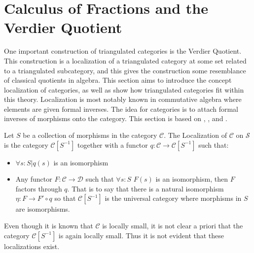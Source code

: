 \section{Calculus of Fractions and the Verdier Quotient}
    One important construction of triangulated categories is the Verdier Quotient. This construction is a localization of a triangulated category at some set related to a triangulated subcategory, and this gives the construction some resemblance of classical quotients in algebra. This section aims to introduce the concept localization of categories, as well as show how triangulated categories fit within this theory. Localization is most notably known in commutative algebra where elements are given formal inverses. The idea for categories is to attach formal inverses of morphisms onto the category. This section is based on \cite{weibel}, \cite{zisman}, and \cite{neeman}.
    \begin{definition}
        Let $S$ be a collection of morphisms in the category $\mathcal{C}$. The Localization of $\mathcal{C}$ on $\mathcal{S}$ is the category $\mathcal{C}[S^{-1}]$ together with a functor $q:\mathcal{C}\rightarrow \mathcal{C}[S^{-1}]$ such that:
        \begin{itemize}
            \item $\forall s:S|q(s)$ is an isomorphism
            \item Any functor $F:\mathcal{C}\rightarrow\mathcal{D}$ such that $\forall s:S$ $F(s)$ is an isomorphism, then $F$ factors through $q$. That is to say that there is a natural isomorphism $\eta : F\rightarrow F'\circ q$ so that $\mathcal{C}[S^{-1}]$ is the universal category where morphisms in $S$ are isomorphisms.
        \end{itemize}
        \begin{center}
        \end{center}
    \end{definition}

    \begin{remark}
        Even though it is known that $\mathcal{C}$ is locally small, it is not clear a priori that the category $\mathcal{C}[S^{-1}]$ is again locally small. Thus it is not evident that these localizations exist.
    \end{remark}

